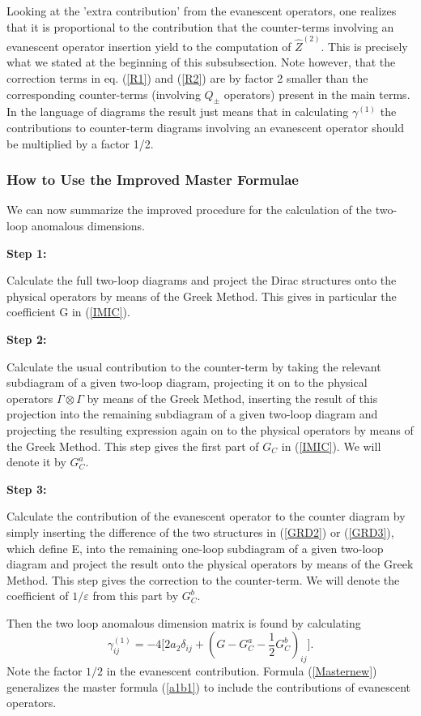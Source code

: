 \documentclass[12pt,rotate]{article}
\newcommand{\be}{\begin{equation}}
\newcommand{\ee}{\end{equation}}
\begin{document}
\begin{itemize}
\begin{itemize}
 Looking at the 'extra contribution'
 from the evanescent operators, one realizes that it is proportional
 to the contribution that the counter-terms involving an
 evanescent operator
 insertion yield to the
 computation of $\hat Z^{(2)}$. 
 This 
is precisely what we stated at the beginning of this subsubsection.
 Note however, 
that the correction terms in eq. (\ref{R1}) and (\ref{R2}) 
are by factor 2
 smaller than 
the corresponding counter-terms (involving $Q_\pm$ operators)
 present in the main 
terms. In the language of diagrams the result just means that
in calculating $\gamma^{(1)}$ the 
contributions to counter-term
 diagrams involving an evanescent
 operator should be multiplied by a factor 1/2.

\subsubsection{How to Use the Improved Master Formulae}
We can now summarize the improved procedure for the calculation
of the two-loop anomalous dimensions.

{\bf Step 1:}

Calculate the full two-loop diagrams and project the 
Dirac structures onto the physical operators by means of the
Greek Method. This gives in particular the coefficient G in
(\ref{IMIC}).

{\bf Step 2:}

Calculate the usual contribution to the counter-term by taking
the relevant subdiagram of a given two-loop diagram, 
projecting it on to the physical
operators $\Gamma\otimes\Gamma$ by means of the Greek Method, 
inserting the result
of this projection into the remaining subdiagram  of a given
 two-loop diagram
and projecting the resulting expression again on to the physical
operators by means of the Greek Method.
 This step gives the first part of $G_C$ in (\ref{IMIC}).
We will denote it by $G^a_C$.

\newpage
{\bf Step 3:} 

Calculate the contribution of the evanescent operator to the
counter diagram by simply inserting
the difference of the two structures in (\ref{GRD2}) or
(\ref{GRD3}), which define E,
into the remaining one-loop subdiagram of a given two-loop
diagram and project the result onto the physical operators
by means of the Greek Method. This step gives the correction
to the counter-term. We will denote the coefficient of $1/\varepsilon$
from this part by $G^b_C$.

Then the two loop anomalous dimension matrix is found by calculating
\be\label{Masternew}
\gamma^{(1)}_{ij}= -4 \lbrack 2a_2 \delta_{ij} 
+(G-G^a_C-\frac{1}{2}G^b_C)_{ij}
\rbrack.
\ee 
Note the factor $1/2$ in the evanescent contribution. Formula
(\ref{Masternew}) generalizes the master formula (\ref{a1b1})
to include the contributions of evanescent operators.


\end{itemize}
\end{itemize}
\end{document}
